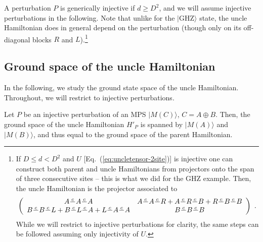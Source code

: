 \documentclass[cmp]{svjour}
\newcommand{\ket}[1]{|#1\rangle}
\def\cont{\tfrac{c}{\ \ }}
\begin{document}
A perturbation $P$ is generically injective if $d\ge D^2$, and we will
assume injective perturbations in the following.  Note that unlike for the
$\ket{\mathrm{GHZ}}$ state, the uncle Hamiltonian does in general depend on the
perturbation (though only on its off-diagonal blocks $R$ and
$L$).\footnote{
    If $D\le d< D^2$ and $U$ [Eq.~(\ref{eq:uncletensor-2site})]
    is injective one can construct both parent and uncle Hamiltonians
    from projectors onto the span of three consecutive sites -- this
    is what we did for the GHZ example.  Then, the uncle
    Hamiltonian is the projector associated
    to
    \[
        \left( \begin{array}{c@{\quad}c}
                A\cont A\cont A                                 & A\cont A\cont R+A\cont R\cont B+R\cont B\cont B \\
                B\cont B\cont L+B\cont L\cont A+L\cont A\cont A & B\cont B\cont B
            \end{array} \right)\ .
    \]
    While we will restrict to injective perturbations for clarity, the same
    steps can be followed assuming only injectivity of $U$.
}

\subsection{Ground space of the uncle Hamiltonian}


In the following, we study the ground state space of the uncle
Hamiltonian. Throughout, we will restrict to injective perturbations.
\begin{theorem}
    \label{thm:gs-subspace-uncle}
    Let $P$ be an injective perturbation of an MPS $\ket{M(C)}$, $C=A\oplus
        B$.  Then, the ground space of the uncle Hamiltonian $H'_P$ is spanned by
    $\ket{M(A)}$ and $\ket{M(B)}$, and thus equal to the ground space of the
    parent Hamiltonian.
\end{theorem}
\end{document}

